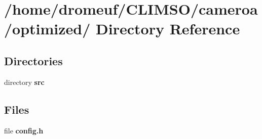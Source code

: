 \section{/home/dromeuf/CLIMSO/cameroa/optimized/ Directory Reference}
\label{dir_b2f41dacd5398205c5564e0460f7e3fc}
\subsection*{Directories}
\begin{CompactItemize}
\item 
directory {\bf src}
\end{CompactItemize}
\subsection*{Files}
\begin{CompactItemize}
\item 
file {\bf config.h}
\end{CompactItemize}

